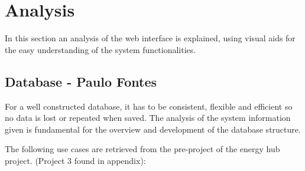 \section{Analysis}
In this section an analysis of the web interface is explained, using visual aids for the easy understanding of the system functionalities.

\subsection{Database - Paulo Fontes}
For a well constructed database, it has to be consistent, flexible and efficient so no data is lost or repeated when saved. The analysis of the system information given is fundamental for the overview and development of the database structure.

The following use cases are retrieved from the pre-project of the energy hub project. (Project 3 found in appendix):
